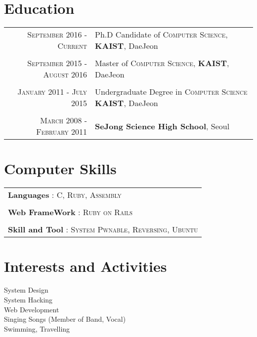 \documentclass[a4paper,10pt]{article}
\begin{document}
\section{Education}
\begin{tabular}{rl}	
 \textsc{September 2016 - Current} & Ph.D Candidate of \textsc{Computer Science}, \textbf{KAIST}, DaeJeon\\&\\
 \textsc{September 2015 - August 2016} & Master of \textsc{Computer Science}, \textbf{KAIST}, DaeJeon\\&\\
\textsc{January 2011 - July 2015} & Undergraduate Degree in \textsc{Computer Science} \normalsize\textbf{KAIST}, DaeJeon\\&\\
\textsc{March 2008 - February 2011}&  \textbf{SeJong Science High School}, Seoul\\
\end{tabular}


\section{Computer Skills}
\begin{tabular}{l}
    \textbf{Languages} :   \textsc{C}, \textsc{Ruby}, \textsc{Assembly} \\\\
    \textbf{Web FrameWork} :   \textsc{Ruby on Rails}\\\\
    \textbf{Skill and Tool} : \textsc{System Pwnable}, \textsc{Reversing}, \textsc{Ubuntu}\\
\end{tabular}

\section{Interests and Activities}
System Design\\
System Hacking\\
Web Development\\
Singing Songs (Member of Band, Vocal)\\
Swimming, Travelling


\end{document}
